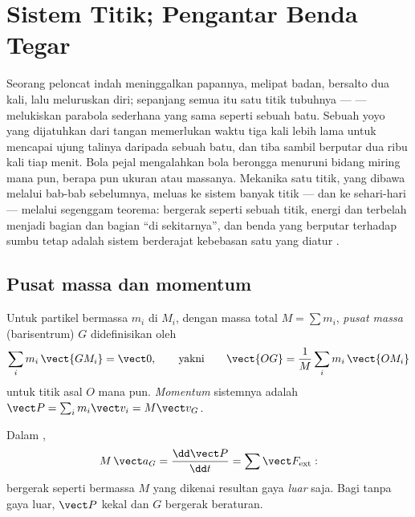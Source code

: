 \chapter{Sistem Titik; Pengantar Benda Tegar}\label{ch:b1:systems-of-points}

Seorang peloncat indah meninggalkan papannya, melipat badan, bersalto dua
kali, lalu meluruskan diri; sepanjang semua itu satu titik tubuhnya ---
 --- melukiskan parabola sederhana yang sama seperti sebuah
batu. Sebuah yoyo yang dijatuhkan dari tangan memerlukan waktu tiga kali
lebih lama untuk mencapai ujung talinya daripada sebuah batu, dan tiba
sambil berputar dua ribu kali tiap menit. Bola pejal mengalahkan bola
berongga menuruni bidang miring mana pun, berapa pun ukuran atau massanya.
Mekanika satu titik, yang dibawa melalui bab-bab sebelumnya, meluas ke
sistem banyak titik --- dan ke  sehari-hari --- melalui
segenggam teorema:  bergerak seperti sebuah titik, energi
dan  terbelah menjadi bagian  dan bagian ``di
sekitarnya'', dan benda yang berputar terhadap sumbu tetap adalah sistem
berderajat kebebasan satu yang diatur .

\section{Pusat massa dan momentum}

\begin{definition}\label{def:b1:systems-of-points:cm}
Untuk partikel bermassa $m_i$ di $M_i$, dengan massa total $M = \sum m_i$,
\emph{pusat massa} (barisentrum) $G$ didefinisikan oleh
\[
\sum_i m_i\,\vect{GM_i} = \vect 0, \qquad\text{yakni}\qquad
\vect{OG} = \frac{1}{M}\sum_i m_i\,\vect{OM_i}
\]
untuk titik asal $O$ mana pun. \emph{Momentum} sistemnya adalah $\vect P =
\sum_i m_i\vect v_i = M\vect v_G$.
\end{definition}

\begin{theorem}\label{thm:b1:systems-of-points:cmtheorem}
Dalam ,
\[
M\,\vect a_G = \frac{\dd\vect P}{\dd t} = \sum\vect F_{\mathrm{ext}} :
\]
 bergerak seperti  bermassa $M$ yang dikenai
resultan gaya \emph{luar} saja. Bagi  tanpa
gaya luar, $\vect P$ kekal dan $G$ bergerak beraturan.
\end{theorem}

